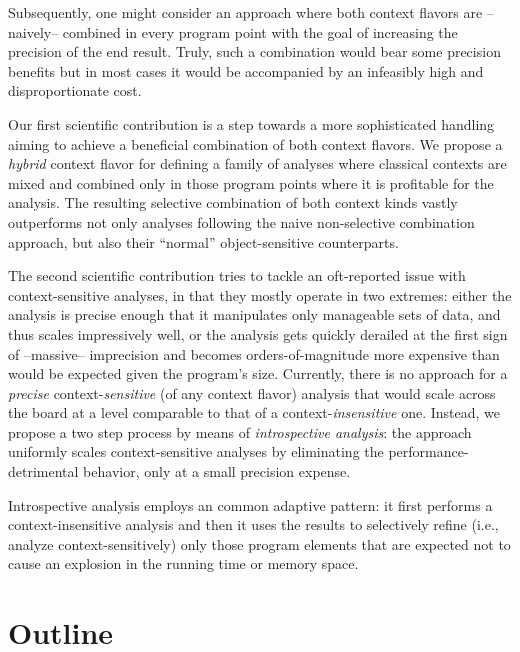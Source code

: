 Subsequently, one might consider an approach where both context flavors are --naively-- combined in every program point with the goal of increasing the precision of the end result. Truly, such a combination would bear some precision benefits but in most cases it would be accompanied by an infeasibly high and disproportionate cost.

Our first scientific contribution is a step towards a more sophisticated handling aiming to achieve a beneficial combination of both context flavors. We propose a \emph{hybrid} context flavor for defining a family of analyses where classical contexts are mixed and combined only in those program points where it is profitable for the analysis. The resulting selective combination of both context kinds vastly outperforms not only analyses following the naive non-selective combination approach, but also their ``normal'' object-sensitive counterparts.

The second scientific contribution tries to tackle an oft-reported issue with context-sensitive analyses, in that they mostly operate in two extremes: either the analysis is precise enough that it manipulates only manageable sets of data, and thus scales impressively well, or the analysis gets quickly derailed at the first sign of --massive-- imprecision and becomes orders-of-magnitude more expensive than would be expected given the program's size. Currently, there is no approach for a \emph{precise} context-\emph{sensitive} (of any context flavor) analysis that would scale across the board at a level comparable to that of a context-\emph{insensitive} one. Instead, we propose a two step process by means of \emph{introspective analysis}: the approach uniformly scales context-sensitive analyses by eliminating the performance-detrimental behavior, only at a small precision expense.

Introspective analysis employs an common adaptive pattern: it first performs a context-insensitive analysis and then it uses the results to selectively refine (i.e., analyze context-sensitively) only those program elements that are expected not to cause an explosion in the running time or memory space.


\section{Outline}

